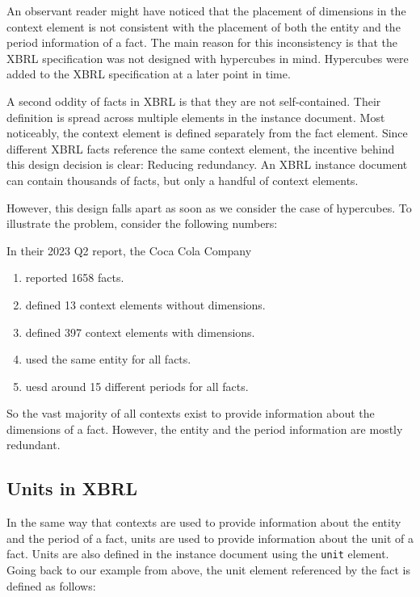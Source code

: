 An observant reader might have noticed that the placement of dimensions in the context element is not consistent with the placement of both the entity and the period information of a fact.
The main reason for this inconsistency is that the XBRL specification was not designed with hypercubes in mind.
Hypercubes were added to the XBRL specification at a later point in time.

A second oddity of facts in XBRL is that they are not self-contained. 
Their definition is spread across multiple elements in the instance document.
Most noticeably, the context element is defined separately from the fact element.
Since different XBRL facts reference the same context element, the incentive behind this design decision is clear: Reducing redundancy.
An XBRL instance document can contain thousands of facts, but only a handful of context elements.

However, this design falls apart as soon as we consider the case of hypercubes.
To illustrate the problem, consider the following numbers:

In their 2023 Q2 report, the Coca Cola Company 

\begin{enumerate}
    \item reported 1658 facts.
    \item defined 13 context elements without dimensions.
    \item defined 397 context elements with dimensions.
    \item used the same entity for all facts.
    \item uesd around 15 different periods for all facts.
\end{enumerate}

So the vast majority of all contexts exist to provide information about the dimensions of a fact.
However, the entity and the period information are mostly redundant.

\subsection{Units in XBRL}

In the same way that contexts are used to provide information about the entity and the period of a fact, units are used to provide information about the unit of a fact.
Units are also defined in the instance document using the \texttt{unit} element.
Going back to our example from above, the unit element referenced by the fact is defined as follows:

